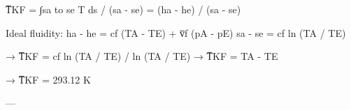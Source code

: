 T̅KF = ∫sa to se T ds / (sa - se) = (ha - he) / (sa - se)  

Ideal fluidity:  
ha - he = cf (TA - TE) + v̅f (pA - pE)  
sa - se = cf ln (TA / TE)  

→ T̅KF = cf ln (TA / TE) / ln (TA / TE)  
→ T̅KF = TA - TE  

→ T̅KF = 293.12 K  

---